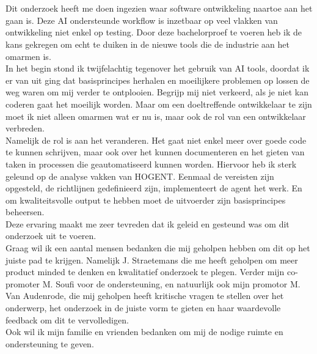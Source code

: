 
\chapter*{}%
\label{ch:voorwoord}


Dit onderzoek heeft me doen ingezien waar software ontwikkeling naartoe aan het gaan is. Deze AI ondersteunde workflow is inzetbaar op veel vlakken van ontwikkeling niet enkel op testing. Door deze bachelorproef te voeren heb ik de kans gekregen om echt te duiken in de nieuwe tools die de industrie aan het omarmen is.
\bigskip
\\
In het begin stond ik twijfelachtig tegenover het gebruik van AI tools, doordat ik er van uit ging dat basisprincipes herhalen en moeilijkere problemen op lossen de weg waren om mij verder te ontplooien. Begrijp mij niet verkeerd, als je niet kan coderen gaat het moeilijk worden. Maar om een doeltreffende ontwikkelaar te zijn moet ik niet alleen omarmen wat er nu is, maar ook de rol van een ontwikkelaar verbreden.
\bigskip
\\
Namelijk de rol is aan het veranderen. Het gaat niet enkel meer over goede code te kunnen schrijven, maar ook over het kunnen documenteren en het gieten van taken in processen die geautomatiseerd kunnen worden. Hiervoor heb ik sterk geleund op de analyse vakken van HOGENT. Eenmaal de vereisten zijn opgesteld, de richtlijnen gedefinieerd zijn, implementeert de agent het werk. En om kwaliteitsvolle output te hebben moet de uitvoerder zijn basisprincipes beheersen.
\bigskip
\\
Deze ervaring maakt me zeer tevreden dat ik geleid en gesteund was om dit onderzoek uit te voeren.
\bigskip
\\
Graag wil ik een aantal mensen bedanken die mij geholpen hebben om dit op het juiste pad te krijgen. Namelijk J. Straetemans die me heeft geholpen om meer product minded te denken en kwalitatief onderzoek te plegen. Verder mijn co-promoter M. Soufi voor de ondersteuning, en natuurlijk ook mijn promotor M. Van Audenrode, die mij geholpen heeft kritische vragen te stellen over het onderwerp, het onderzoek in de juiste vorm te gieten en haar waardevolle feedback om dit te vervolledigen.
\bigskip
\\
Ook wil ik mijn familie en vrienden bedanken om mij de nodige ruimte en ondersteuning te geven. 